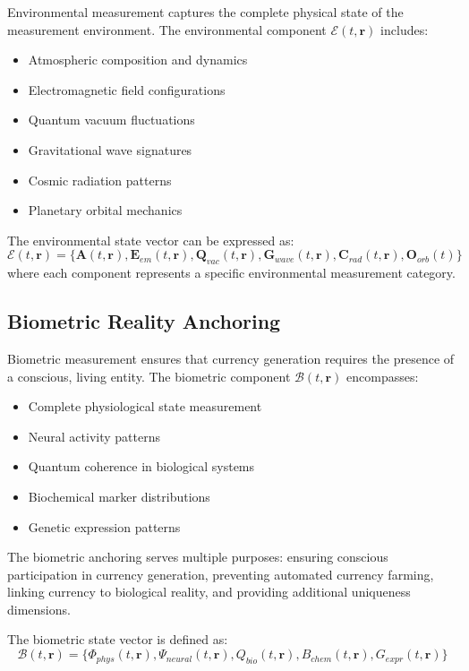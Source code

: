 \documentclass[12pt,a4paper]{article}
\begin{document}
Environmental measurement captures the complete physical state of the measurement environment. The environmental component $\mathcal{E}(t,\mathbf{r})$ includes:

\begin{itemize}
\item Atmospheric composition and dynamics
\item Electromagnetic field configurations
\item Quantum vacuum fluctuations
\item Gravitational wave signatures
\item Cosmic radiation patterns
\item Planetary orbital mechanics
\end{itemize}

The environmental state vector can be expressed as:
\begin{equation}
\mathcal{E}(t,\mathbf{r}) = \{\mathbf{A}(t,\mathbf{r}), \mathbf{E}_{em}(t,\mathbf{r}), \mathbf{Q}_{vac}(t,\mathbf{r}), \mathbf{G}_{wave}(t,\mathbf{r}), \mathbf{C}_{rad}(t,\mathbf{r}), \mathbf{O}_{orb}(t)\}
\end{equation}
where each component represents a specific environmental measurement category.

\subsection{Biometric Reality Anchoring}

Biometric measurement ensures that currency generation requires the presence of a conscious, living entity. The biometric component $\mathcal{B}(t,\mathbf{r})$ encompasses:

\begin{itemize}
\item Complete physiological state measurement
\item Neural activity patterns
\item Quantum coherence in biological systems
\item Biochemical marker distributions
\item Genetic expression patterns
\end{itemize}

The biometric anchoring serves multiple purposes: ensuring conscious participation in currency generation, preventing automated currency farming, linking currency to biological reality, and providing additional uniqueness dimensions.

The biometric state vector is defined as:
\begin{equation}
\mathcal{B}(t,\mathbf{r}) = \{\Phi_{phys}(t,\mathbf{r}), \Psi_{neural}(t,\mathbf{r}), Q_{bio}(t,\mathbf{r}), B_{chem}(t,\mathbf{r}), G_{expr}(t,\mathbf{r})\}
\end{equation}
\end{document}
